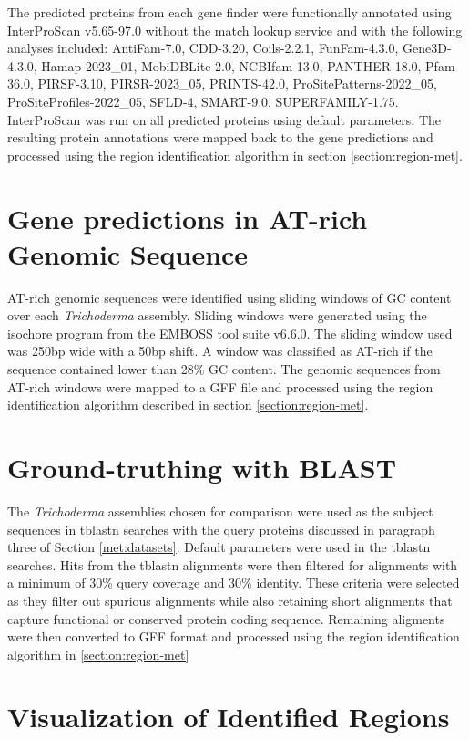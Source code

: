The predicted proteins from each gene finder were functionally
annotated using InterProScan
v5.65-97.0\cite{10.1093/bioinformatics/btu031} without the match
lookup service and with the following analyses included: AntiFam-7.0,
CDD-3.20, Coils-2.2.1, FunFam-4.3.0, Gene3D-4.3.0, Hamap-2023\_01,
MobiDBLite-2.0, NCBIfam-13.0, PANTHER-18.0, Pfam-36.0, PIRSF-3.10,
PIRSR-2023\_05, PRINTS-42.0, ProSitePatterns-2022\_05,
ProSiteProfiles-2022\_05, SFLD-4, SMART-9.0,
SUPERFAMILY-1.75. InterProScan was run on all predicted proteins using
default parameters. The resulting protein annotations were mapped back
to the gene predictions and processed using the region identification
algorithm in section \ref{section:region-met}.

\section{Gene predictions in AT-rich Genomic Sequence}

AT-rich genomic sequences were identified using sliding windows of GC
content over each \textit{Trichoderma} assembly. Sliding windows were
generated using the isochore program from the EMBOSS tool suite
v6.6.0\cite{Rice2000}. The sliding window used was 250bp wide with a
50bp shift. A window was classified as AT-rich if the sequence
contained lower than 28\% GC content. The genomic sequences from
AT-rich windows were mapped to a GFF file and processed using the
region identification algorithm described in section
\ref{section:region-met}.

\section{Ground-truthing with BLAST}

The \textit{Trichoderma} assemblies chosen for comparison were used as
the subject sequences in tblastn searches with the query proteins
discussed in paragraph three of Section \ref{met:datasets}. Default
parameters were used in the tblastn searches. Hits from the tblastn
alignments were then filtered for alignments with a minimum of 30\%
query coverage and 30\% identity. These criteria were selected as they
filter out spurious alignments while also retaining short alignments
that capture functional or conserved protein coding
sequence. Remaining aligments were then converted to GFF format and processed using the region identification algorithm in \ref{section:region-met}

\section{Visualization of Identified Regions}

